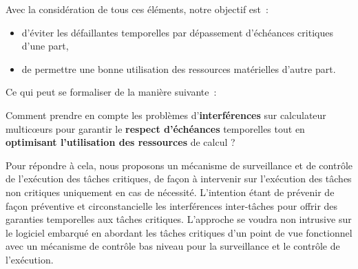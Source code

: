 \documentclass[french, a4paper, 11pt, twoside, pdftex]{StyleThese}
\begin{document}
   Avec la considération de tous ces éléments, notre objectif est~:
   \begin{itemize}
   	\item 	d'éviter les défaillantes temporelles par dépassement d'échéances critiques d'une part, 
   	\item   de permettre une bonne utilisation des ressources matérielles d'autre part.
   \end{itemize} 
	Ce qui peut se formaliser de la manière suivante~: 
	\begin{mdframed}[outerlinewidth=1.5pt,
	innerlinewidth=1.5pt,
	middlelinewidth=2pt,
	middlelinecolor=white,
	bottomline=false,topline=false,rightline=false]
	Comment prendre en compte les problèmes d’\textbf{interférences} sur calculateur multicœurs  pour garantir le \textbf{respect d’échéances} temporelles tout en \textbf{optimisant l’utilisation des ressources} de calcul ?
\end{mdframed}
	
	Pour répondre à cela, nous proposons un mécanisme de surveillance et de contrôle de l'exécution des tâches critiques, de façon à intervenir sur l'exécution des tâches non critiques uniquement en cas de nécessité. L'intention étant de prévenir de façon préventive et circonstancielle les interférences inter-tâches pour offrir des garanties temporelles aux tâches critiques. L'approche se voudra non intrusive sur le logiciel embarqué en abordant les tâches critiques d'un point de vue fonctionnel avec un mécanisme de contrôle bas niveau pour la surveillance et le contrôle de l'exécution.  

\ifdefined{}
\else


\end{document}
